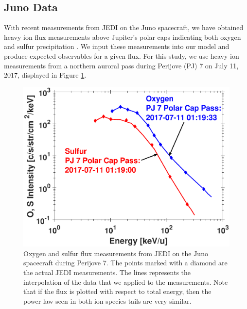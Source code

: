 \documentclass[draft]{agujournal2018}
\begin{document}
\subsection{Juno Data}

With recent measurements from JEDI \citep{mauk2017ssr} on the Juno spacecraft, we have obtained heavy ion flux measurements above Jupiter's polar caps indicating both oxygen and sulfur precipitation \citep{haggerty2017,clark2017a,clark2017b}.
We input these measurements into our model and produce expected observables for a given flux.
For this study, we use heavy ion measurements from a northern auroral pass during Perijove (PJ) 7 on July 11, 2017, displayed in Figure \ref{fig:JEDIFlux}.

\begin{figure}
    \centering
    \includegraphics[width=\textwidth]{Figures/O+S_PJ7.eps}
    \caption{Oxygen and sulfur flux measurements from JEDI on the Juno spacecraft during Perijove 7. The points marked with a diamond are the actual JEDI measurements. The lines represents the interpolation of the data that we applied to the measurements. Note that if the flux is plotted with respect to total energy, then the power law seen in both ion species tails are very similar.}
    \label{fig:JEDIFlux}
\end{figure}
\end{document}
